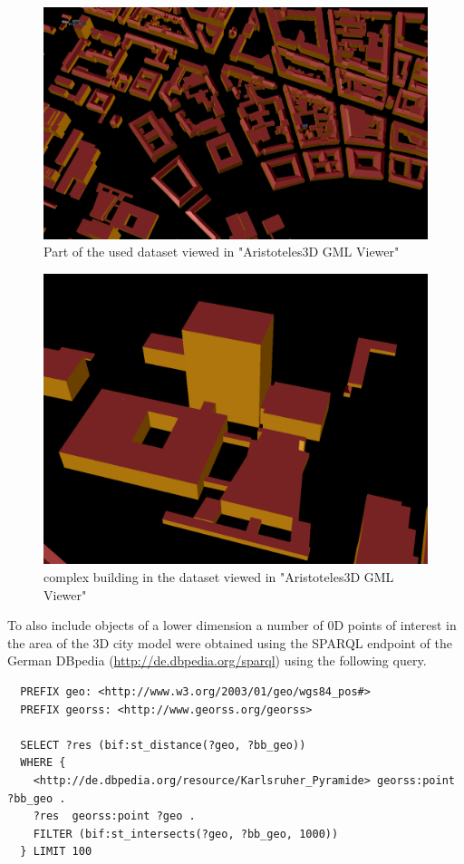 \documentclass[paper=a4, fontsize=11pt]{scrartcl} %
\numberwithin{equation}{section} %
\numberwithin{figure}{section} %
\numberwithin{table}{section} %
\begin{document}
\begin{figure}
  \centering
  \includegraphics[width=34em]{img/city_model}
  \caption{Part of the used dataset viewed in "Aristoteles3D GML Viewer"}
  \label{fig:city_model}
\end{figure}

\begin{figure}[h]
  \centering
  \includegraphics[width=34em]{img/city_model_detailed}
  \caption{complex building in the dataset viewed in "Aristoteles3D GML Viewer"}
  \label{fig:city_model_detailed}
\end{figure}


To also include objects of a lower dimension a number of 0D points of interest in the area of the 3D city model were obtained using the SPARQL endpoint of the German DBpedia (\url{http://de.dbpedia.org/sparql}) using the following query.

\begin{verbatim}
  PREFIX geo: <http://www.w3.org/2003/01/geo/wgs84_pos#>
  PREFIX georss: <http://www.georss.org/georss>

  SELECT ?res (bif:st_distance(?geo, ?bb_geo))
  WHERE {
    <http://de.dbpedia.org/resource/Karlsruher_Pyramide> georss:point ?bb_geo .
    ?res  georss:point ?geo .
    FILTER (bif:st_intersects(?geo, ?bb_geo, 1000))
  } LIMIT 100
\end{verbatim}
\end{document}

